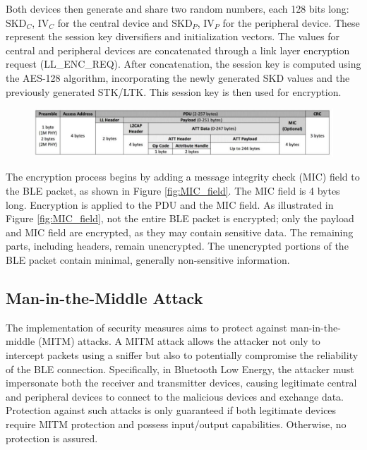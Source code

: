 \documentclass{Configuration_Files/PoliMi3i_thesis}
\begin{document}
Both devices then generate and share two random numbers, each 128 bits long: \( \text{SKD}_C \), \( \text{IV}_C \) for the central device and \( \text{SKD}_P \), \( \text{IV}_P \) for the peripheral device. These represent the session key diversifiers and initialization vectors. The values for central and peripheral devices are concatenated through a link layer encryption request (LL\_ENC\_REQ). After concatenation, the session key is computed using the AES-128 algorithm, incorporating the newly generated SKD values and the previously generated STK/LTK. This session key is then used for encryption.


\begin{figure}[H]
    \centering
    \includegraphics[scale=0.7]{Bluetooth_Security/10.png}
    \label{fig:pairing_procedure}
\end{figure}

The encryption process begins by adding a message integrity check (MIC) field to the BLE packet, as shown in Figure \ref{fig:MIC_field}. The MIC field is 4 bytes long. Encryption is applied to the PDU and the MIC field. As illustrated in Figure \ref{fig:MIC_field}, not the entire BLE packet is encrypted; only the payload and MIC field are encrypted, as they may contain sensitive data. The remaining parts, including headers, remain unencrypted. The unencrypted portions of the BLE packet contain minimal, generally non-sensitive information.

\subsection{Man-in-the-Middle Attack}

The implementation of security measures aims to protect against man-in-the-middle (MITM) attacks. A MITM attack allows the attacker not only to intercept packets using a sniffer but also to potentially compromise the reliability of the BLE connection. Specifically, in Bluetooth Low Energy, the attacker must impersonate both the receiver and transmitter devices, causing legitimate central and peripheral devices to connect to the malicious devices and exchange data. Protection against such attacks is only guaranteed if both legitimate devices require MITM protection and possess input/output capabilities. Otherwise, no protection is assured.
\end{document}
